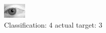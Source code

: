 \begin{figure}[h!]
\begin{center}
\includegraphics[width=0.60\columnwidth]{figures/ID2824_class_4_target_3.png}
\end{center}
\caption{ Classification: 4 actual target: 3}
\label{fig:ID2824_class_4_target_3}
\end{figure}
